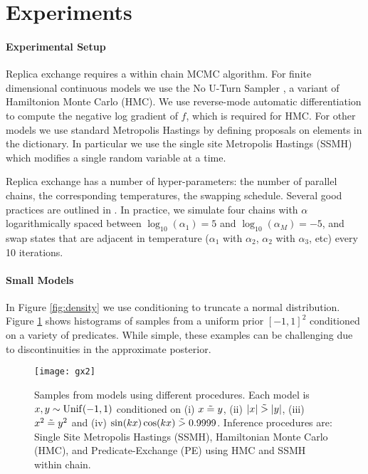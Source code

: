 
\section{Experiments}\label{experiments}

\paragraph{Experimental Setup}Replica exchange requires a within chain MCMC algorithm.
For finite dimensional continuous models we use the No U-Turn Sampler \cite{hoffman2014no}, a variant of Hamiltonion Monte Carlo (HMC).
We use reverse-mode automatic differentiation \cite{griewank2008evaluating} to compute the negative log gradient of $f$, which is required for HMC.
For other models we use standard Metropolis Hastings by defining proposals on elements in the dictionary.
In particular we use the single site Metropolis Hastings (SSMH) \cite{wingate2011lightweight} which modifies a single random variable at a time.

Replica exchange has a number of hyper-parameters: the number of parallel chains, the corresponding temperatures, the swapping schedule.
Several good practices are outlined in \cite{earl2005parallel}.  In practice, we simulate four chains with $\alpha$ logarithmically spaced between $\log_{10}(\alpha_1) = 5$ and $\log_{10}(\alpha_M) = -5$, and swap states that are adjacent in temperature ($\alpha_1$ with $\alpha_2$, $\alpha_2$ with $\alpha_3$, etc) every 10 iterations.


\paragraph{Small Models}
In Figure \ref{fig:density} we use conditioning to truncate a normal distribution. Figure  \ref{gridn} shows histograms of samples from a uniform prior  $[-1, 1]^2$ conditioned on a variety of predicates.  While simple, these examples can be challenging due to discontinuities in the approximate posterior.



\begin{figure}[!htb]
	\centering
	\texttt{[image: gx2]}
	\caption{Samples from models using different procedures.  Each model is $x,y \sim \operatorname{Unif}(-1,1)$ conditioned on (i) $x \mathrel{\tilde{=}} y$, (ii) $|x| \mathrel{\tilde{>}} |y|$, (iii) $x^2 \mathrel{\tilde{=}} y^2$ and (iv) $\sin(kx)\cos(kx) \mathrel{\tilde{>}} 0.9999$.
	Inference procedures are: Single Site Metropolis Hastings (SSMH), Hamiltonian Monte Carlo (HMC), and Predicate-Exchange (PE) using HMC and SSMH within chain.}
	\label{gridn}
	\vspace{-1em}
\end{figure}	

